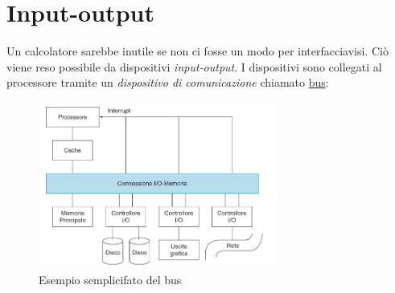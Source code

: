 \section{Input-output}
Un calcolatore sarebbe inutile se non ci fosse un modo per interfacciavisi. Ciò viene reso possibile da dispositivi \textit{input-output}. I dispositivi sono collegati al processore tramite un \textit{dispositivo di comunicazione} chiamato \underline{bus}:
\begin{figure}[H]
	\begin{center}
		\includegraphics[width = 0.7\textwidth]{Images/bus.png }
	\end{center}
	\caption{Esempio semplicifato del bus}
\end{figure}
